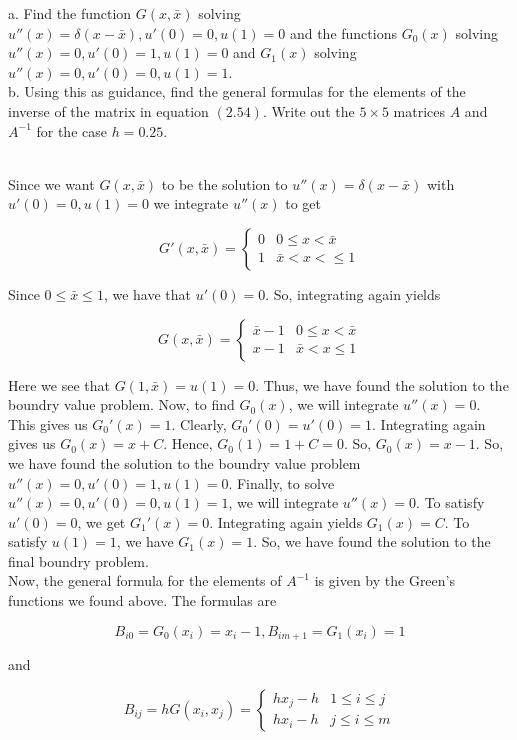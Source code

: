 a. Find the function $G(x,\bar{x})$ solving $u''(x)=\delta(x-\bar{x}), u'(0)=0, u(1)=0$ and the
functions $G_0(x)$ solving $u''(x)=0, u'(0)=1, u(1)=0$ and $G_1(x)$ solving $u''(x)=0, u'(0)=0, 
u(1)=1$.\\
b. Using this as guidance, find the general formulas for the elements of the inverse of the matrix in
equation $(2.54)$. Write out the $5\times5$ matrices $A$ and $A^{-1}$ for the case $h=0.25$.\\

\begin{solution}\renewcommand{\qedsymbol}{}\ \\
    Since we want $G(x,\bar{x})$ to be the solution to $u''(x)=\delta(x-\bar{x})$ with $u'(0)=0, u(1)=0$
    we integrate $u''(x)$ to get
    
    $$G'(x,\bar{x})=\begin{cases} 0 & 0\leq x<\bar{x} \\ 1 & \bar{x}<x<\leq1 \end{cases}$$
    
    Since $0\leq\bar{x}\leq1$, we have that $u'(0)=0$. So, integrating again yields
    
    $$G(x,\bar{x})=\begin{cases} \bar{x}-1 & 0\leq x<\bar{x} \\ x-1 & \bar{x}<x\leq1 \end{cases}$$
    
    Here we see that $G(1,\bar{x})=u(1)=0$. Thus, we have found the solution to the boundry value
    problem. Now, to find $G_0(x)$, we will integrate $u''(x)=0$. This gives us $G_0'(x)=1$. Clearly,
    $G_0'(0)=u'(0)=1$. Integrating again gives us $G_0(x)=x+C$. Hence, $G_0(1)=1+C=0$. So, $G_0(x)=x-1$.
    So, we have found the solution to the boundry value problem $u''(x)=0, u'(0)=1, u(1)=0$. Finally, to
    solve $u''(x)=0, u'(0)=0, u(1)=1$, we will integrate $u''(x)=0$. To satisfy $u'(0)=0$, we get
    $G_1'(x)=0$. Integrating again yields $G_1(x)=C$. To satisfy $u(1)=1$, we have $G_1(x)=1$. So, we
    have found the solution to the final boundry problem.\\

    Now, the general formula for the elements of $A^{-1}$ is given by the Green's functions we found
    above. The formulas are
    
    $$B_{i0}=G_0(x_i)=x_i-1, B_{i m+1}=G_1(x_i)=1$$
    
    and
    
    $$B_{ij}=hG(x_i,x_j)=\begin{cases} hx_j-h & 1\leq i\leq j \\ hx_i-h & j\leq i\leq m \end{cases}$$
    

\end{solution}
